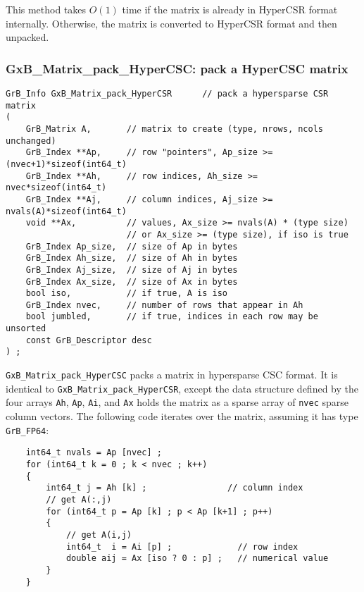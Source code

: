 \documentclass[12pt]{article}
\begin{document}
{This method takes $O(1)$ time if the matrix is already in HyperCSR format
internally.  Otherwise, the matrix is converted to HyperCSR format and then
unpacked.

\newpage
\subsubsection{{\sf GxB\_Matrix\_pack\_HyperCSC:} pack a HyperCSC matrix}
\label{matrix_pack_hypercsc}

\begin{mdframed}[userdefinedwidth=6in]
{\footnotesize
\begin{verbatim}
GrB_Info GxB_Matrix_pack_HyperCSR      // pack a hypersparse CSR matrix
(
    GrB_Matrix A,       // matrix to create (type, nrows, ncols unchanged)
    GrB_Index **Ap,     // row "pointers", Ap_size >= (nvec+1)*sizeof(int64_t)
    GrB_Index **Ah,     // row indices, Ah_size >= nvec*sizeof(int64_t)
    GrB_Index **Aj,     // column indices, Aj_size >= nvals(A)*sizeof(int64_t)
    void **Ax,          // values, Ax_size >= nvals(A) * (type size)
                        // or Ax_size >= (type size), if iso is true
    GrB_Index Ap_size,  // size of Ap in bytes
    GrB_Index Ah_size,  // size of Ah in bytes
    GrB_Index Aj_size,  // size of Aj in bytes
    GrB_Index Ax_size,  // size of Ax in bytes
    bool iso,           // if true, A is iso
    GrB_Index nvec,     // number of rows that appear in Ah
    bool jumbled,       // if true, indices in each row may be unsorted
    const GrB_Descriptor desc
) ;
\end{verbatim}
} \end{mdframed}

\verb'GxB_Matrix_pack_HyperCSC' packs a matrix in hypersparse CSC format.
It is identical to \verb'GxB_Matrix_pack_HyperCSR', except the data
structure defined by the four arrays \verb'Ah', \verb'Ap', \verb'Ai', and
\verb'Ax' holds the matrix as a sparse array of \verb'nvec' sparse column
vectors.  The following code iterates over the matrix,
assuming it has type \verb'GrB_FP64':

    \vspace{-0.10in}
    {\footnotesize
    \begin{verbatim}
    int64_t nvals = Ap [nvec] ;
    for (int64_t k = 0 ; k < nvec ; k++)
    {
        int64_t j = Ah [k] ;                // column index
        // get A(:,j)
        for (int64_t p = Ap [k] ; p < Ap [k+1] ; p++)
        {
            // get A(i,j)
            int64_t  i = Ai [p] ;             // row index
            double aij = Ax [iso ? 0 : p] ;   // numerical value
        }
    } \end{verbatim}}

}
\end{document}
